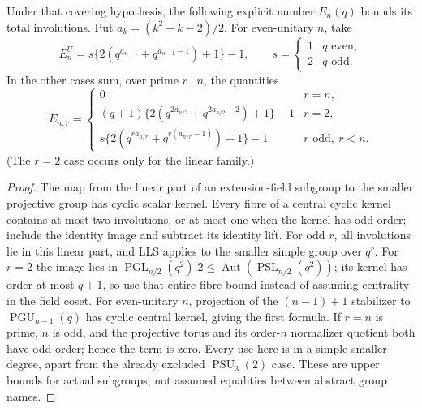 \documentclass[10pt]{article}
\newcommand{\PGL}{\operatorname{PGL}}\newcommand{\PGU}{\operatorname{PGU}}\newcommand{\PSL}{\operatorname{PSL}}\newcommand{\PSU}{\operatorname{PSU}}
\begin{document}
\begin{lemma}\label{coverbound}
Under that covering hypothesis, the following explicit number $E_n(q)$
bounds its total involutions. Put $a_k=(k^2+k-2)/2$.
For even-unitary $n$, take
\[
 E_n^U=s\{2(q^{a_{n-1}}+q^{a_{n-1}-1})+1\}-1,
 \qquad s=\begin{cases}1&q\text{ even},\\2&q\text{ odd}.\end{cases}
\]
In the other cases sum, over prime $r\mid n$, the quantities
\[
 E_{n,r}=\begin{cases}
 0&r=n,\\
 (q+1)\{2(q^{2a_{n/2}}+q^{2a_{n/2}-2})+1\}-1&r=2,\\
 s\{2(q^{r a_{n/r}}+q^{r(a_{n/r}-1)})+1\}-1&r\text{ odd},\ r<n.
 \end{cases}
\]
(The $r=2$ case occurs only for the linear family.)
\end{lemma}
\begin{proof}
The map from the linear part of an extension-field subgroup to the smaller
projective group has cyclic scalar kernel. Every fibre of a central cyclic
kernel contains at most two involutions, or at most one when the kernel has
odd order; include the identity image and subtract its identity lift.
For odd $r$, all involutions lie in this linear part, and LLS applies to
the smaller simple group over $q^r$. For $r=2$ the image lies in
$\PGL_{n/2}(q^2).2\le\operatorname{Aut}(\PSL_{n/2}(q^2))$; its kernel
has order at most $q+1$, so use that entire fibre bound instead of assuming
centrality in the field coset. For even-unitary $n$, projection of the
$(n-1)+1$ stabilizer to $\PGU_{n-1}(q)$ has cyclic central kernel, giving
the first formula. If $r=n$ is prime, $n$ is odd, and the projective torus
and its order-$n$ normalizer quotient both have odd order; hence the term
is zero. Every use here is in a simple smaller degree, apart from the
already excluded $\PSU_3(2)$ case. These are upper bounds for actual
subgroups, not assumed equalities between abstract group names.
\end{proof}
\end{document}
